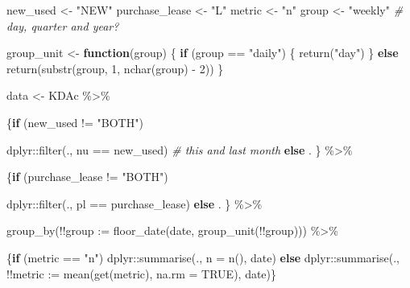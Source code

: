 \documentclass[
]{article}
\newenvironment{Shaded}{\begin{snugshade}}{\end{snugshade}}
\newcommand{\AttributeTok}[1]{\textcolor[rgb]{0.77,0.63,0.00}{#1}}
\newcommand{\CommentTok}[1]{\textcolor[rgb]{0.56,0.35,0.01}{\textit{#1}}}
\newcommand{\ConstantTok}[1]{\textcolor[rgb]{0.00,0.00,0.00}{#1}}
\newcommand{\ControlFlowTok}[1]{\textcolor[rgb]{0.13,0.29,0.53}{\textbf{#1}}}
\newcommand{\DecValTok}[1]{\textcolor[rgb]{0.00,0.00,0.81}{#1}}
\newcommand{\FunctionTok}[1]{\textcolor[rgb]{0.00,0.00,0.00}{#1}}
\newcommand{\NormalTok}[1]{#1}
\newcommand{\OtherTok}[1]{\textcolor[rgb]{0.56,0.35,0.01}{#1}}
\newcommand{\SpecialCharTok}[1]{\textcolor[rgb]{0.00,0.00,0.00}{#1}}
\newcommand{\StringTok}[1]{\textcolor[rgb]{0.31,0.60,0.02}{#1}}
\begin{document}
\begin{Shaded}
\begin{Highlighting}[]
\NormalTok{new\_used }\OtherTok{\textless{}{-}} \StringTok{"NEW"}
\NormalTok{purchase\_lease }\OtherTok{\textless{}{-}} \StringTok{"L"}
\NormalTok{metric }\OtherTok{\textless{}{-}} \StringTok{"n"}
\NormalTok{group }\OtherTok{\textless{}{-}} \StringTok{"weekly"} \CommentTok{\# day, quarter and year?}

\NormalTok{group\_unit }\OtherTok{\textless{}{-}} \ControlFlowTok{function}\NormalTok{(group) \{}
  \ControlFlowTok{if}\NormalTok{ (group }\SpecialCharTok{==} \StringTok{"daily"}\NormalTok{) \{}
    \FunctionTok{return}\NormalTok{(}\StringTok{"day"}\NormalTok{)}
\NormalTok{  \} }\ControlFlowTok{else} \FunctionTok{return}\NormalTok{(}\FunctionTok{substr}\NormalTok{(group, }\DecValTok{1}\NormalTok{, }\FunctionTok{nchar}\NormalTok{(group) }\SpecialCharTok{{-}} \DecValTok{2}\NormalTok{))}
\NormalTok{\}}

\NormalTok{data }\OtherTok{\textless{}{-}}\NormalTok{ KDAc }\SpecialCharTok{\%\textgreater{}\%}

\NormalTok{    \{}\ControlFlowTok{if}\NormalTok{ (new\_used }\SpecialCharTok{!=} \StringTok{"BOTH"}\NormalTok{)}
        
\NormalTok{        dplyr}\SpecialCharTok{::}\FunctionTok{filter}\NormalTok{(., nu }\SpecialCharTok{==}\NormalTok{ new\_used) }\CommentTok{\# this and last month}
      \ControlFlowTok{else}\NormalTok{ .}
\NormalTok{        \} }\SpecialCharTok{\%\textgreater{}\%}
    
\NormalTok{    \{}\ControlFlowTok{if}\NormalTok{ (purchase\_lease }\SpecialCharTok{!=} \StringTok{"BOTH"}\NormalTok{)}
        
\NormalTok{        dplyr}\SpecialCharTok{::}\FunctionTok{filter}\NormalTok{(., pl }\SpecialCharTok{==}\NormalTok{ purchase\_lease)}
      \ControlFlowTok{else}\NormalTok{ .}
\NormalTok{      \} }\SpecialCharTok{\%\textgreater{}\%}
  
  \FunctionTok{group\_by}\NormalTok{(}\SpecialCharTok{!!}\AttributeTok{group :=} \FunctionTok{floor\_date}\NormalTok{(date, }\FunctionTok{group\_unit}\NormalTok{(}\SpecialCharTok{!!}\NormalTok{group))) }\SpecialCharTok{\%\textgreater{}\%}
        
\NormalTok{  \{}\ControlFlowTok{if}\NormalTok{ (metric }\SpecialCharTok{==} \StringTok{"n"}\NormalTok{)}
\NormalTok{    dplyr}\SpecialCharTok{::}\FunctionTok{summarise}\NormalTok{(., }\AttributeTok{n =} \FunctionTok{n}\NormalTok{(), date)}
    \ControlFlowTok{else}
\NormalTok{      dplyr}\SpecialCharTok{::}\FunctionTok{summarise}\NormalTok{(., }\SpecialCharTok{!!}\AttributeTok{metric :=} \FunctionTok{mean}\NormalTok{(}\FunctionTok{get}\NormalTok{(metric), }\AttributeTok{na.rm =} \ConstantTok{TRUE}\NormalTok{), date)\}}
\end{Highlighting}
\end{Shaded}
\end{document}
